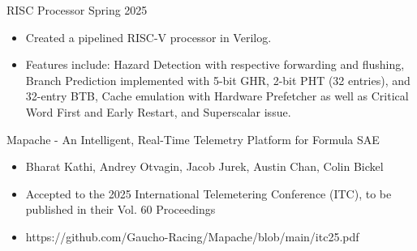 \documentclass[9pt]{developercv} %
\begin{document}
\begin{entrylist}
    \entry
    {}
    {RISC Processor}
    {Spring 2025}
    {\vspace{-12pt}
    \begin{itemize}[noitemsep,topsep=0pt,parsep=0pt,partopsep=0pt, leftmargin=10pt]
    \item Created a pipelined RISC-V processor in Verilog.
    \item Features include: Hazard Detection with respective forwarding and flushing, Branch Prediction implemented with 5-bit GHR, 2-bit PHT (32 entries), and 32-entry BTB, Cache emulation with Hardware Prefetcher as well as Critical Word First and Early Restart, and Superscalar issue.
    \end{itemize}
    }






\end{entrylist}
\vspace{-16 pt}
\begin{entrylist}
    \entry
		{}
		{Mapache - An Intelligent, Real-Time Telemetry Platform for Formula SAE}
		{}
		{\vspace{-8pt}
        \begin{itemize}[noitemsep,topsep=0pt,parsep=0pt,partopsep=0pt, leftmargin=10pt]
            \item Bharat Kathi, Andrey Otvagin, Jacob Jurek, Austin Chan, Colin Bickel
            \item Accepted to the 2025 International Telemetering Conference (ITC), to be published in their Vol. 60 Proceedings
            \item https://github.com/Gaucho-Racing/Mapache/blob/main/itc25.pdf
        \end{itemize}}
\end{entrylist}
\end{document}

